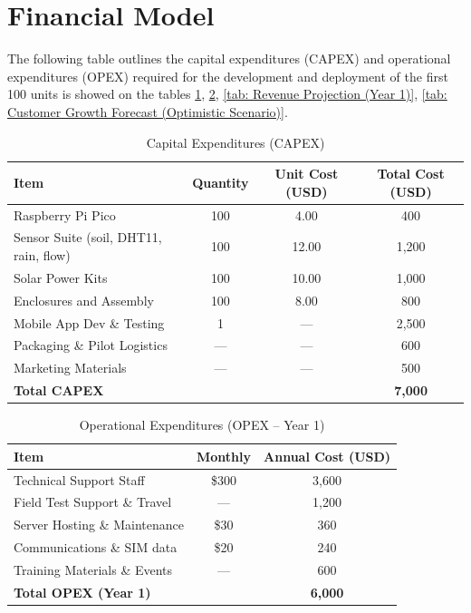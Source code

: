 \documentclass{IEEEtran}
\begin{document}
\section{Financial Model}

The following table outlines the capital expenditures (CAPEX) and operational expenditures (OPEX) required for the development and deployment of the first 100 units is showed on the tables \ref{tab: CAPEX}, \ref{tab: OPEX (Year 1)}, \ref{tab: Revenue Projection (Year 1)}, \ref{tab: Customer Growth Forecast (Optimistic Scenario)}.

\begin{table}
    \centering
    \caption{Capital Expenditures (CAPEX)}
    \label{tab: CAPEX}
    \begin{tabular}{|l|c|c|c|}
        \hline
        \textbf{Item} & \textbf{Quantity} & \textbf{Unit Cost (USD)} & \textbf{Total Cost (USD)} \\
        \hline
        Raspberry Pi Pico & 100 & 4.00 & 400 \\
        Sensor Suite (soil, DHT11, rain, flow) & 100 & 12.00 & 1,200 \\
        Solar Power Kits & 100 & 10.00 & 1,000 \\
        Enclosures and Assembly & 100 & 8.00 & 800 \\
        Mobile App Dev \& Testing & 1 & --- & 2,500 \\
        Packaging \& Pilot Logistics & --- & --- & 600 \\
        Marketing Materials & --- & --- & 500 \\
        \hline
        \textbf{Total CAPEX} & & & \textbf{7,000} \\
        \hline
    \end{tabular}
\end{table}

\begin{table}
    \centering
    \caption{Operational Expenditures (OPEX – Year 1)}
    \label{tab: OPEX (Year 1)}
    \begin{tabular}{|l|c|c|}
        \hline
        \textbf{Item} & \textbf{Monthly} & \textbf{Annual Cost (USD)} \\
        \hline
        Technical Support Staff & \$300 & 3,600 \\
        Field Test Support \& Travel & --- & 1,200 \\
        Server Hosting \& Maintenance & \$30 & 360 \\
        Communications \& SIM data & \$20 & 240 \\
        Training Materials \& Events & --- & 600 \\
        \hline
        \textbf{Total OPEX (Year 1)} & & \textbf{6,000} \\
        \hline
    \end{tabular}
\end{table}
\end{document}
